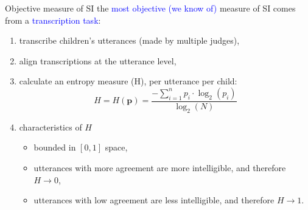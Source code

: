 \begin{frame}
	{Objective measure of SI}
	the \textcolor{blue}{most objective (we know of)} measure of SI comes from a \textcolor{blue}{transcription task}:
	
	\begin{enumerate}
		\item transcribe children's utterances (made by multiple judges),
		\item align transcriptions at the utterance level,
		\item calculate an entropy measure (H), per utterance per child:
		\begin{equation*} \label{eq:entropy}
			H = H(\pmb{p}) = \frac{-\sum_{i=1}^{n} p_{i} \cdot \log_{2}(p_{i})}{\log_{2}(N)}
		\end{equation*}
		\item characteristics of $H$ \citep{Boonen_et_al_2021, Faes_et_al_2021} 
		\begin{itemize}
			\item  bounded in $[0,1]$ space,
			\item utterances with more agreement are more intelligible, and therefore $H \rightarrow 0$,
			\item utterances with low agreement are less intelligible, and therefore $H \rightarrow 1$.
		\end{itemize}
	\end{enumerate}
\end{frame}
%
%
